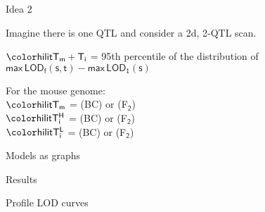 \documentclass[aspectratio=169,12pt,t]{beamer}
\newcommand{\lod}{\text{LOD}}
\begin{document}
\begin{frame}{Idea 2}


\hfill \begin{minipage}{10in}

Imagine there is one QTL and consider a 2d, 2-QTL scan.

\vspace{1cm}

\hspace*{0.5in} $\mathsf{\hilit T_m + T_i}$ = 95th percentile of the
  distribution of \\[6pt]
\hspace*{2.0in} {\lolit $\mathsf{ \text{max} \, \lod_f(s,t) -
    \text{max} \, \lod_1(s)}$}


\vspace{2cm}

For the mouse genome: \\[12pt]
\hspace*{0.5in} $\mathsf{\hilit T_m}$ = {} (BC) or {} (F$_{\mathsf{2}}$) \\[12pt]
\hspace*{0.5in} $\mathsf{\hilit T^H_i}$ = {} (BC) or {} (F$_{\mathsf{2}}$) \\[12pt]
\hspace*{0.5in} $\mathsf{\hilit T^L_i}$ = {} (BC) or {} (F$_{\mathsf{2}}$)


\end{minipage}

\note{
}
\end{frame}





\begin{frame}[c]{Models as graphs}


\note{
}
\end{frame}





\begin{frame}[c]{Results}


\note{
}
\end{frame}



\begin{frame}{Profile LOD curves}


\note{
}
\end{frame}
\end{document}
